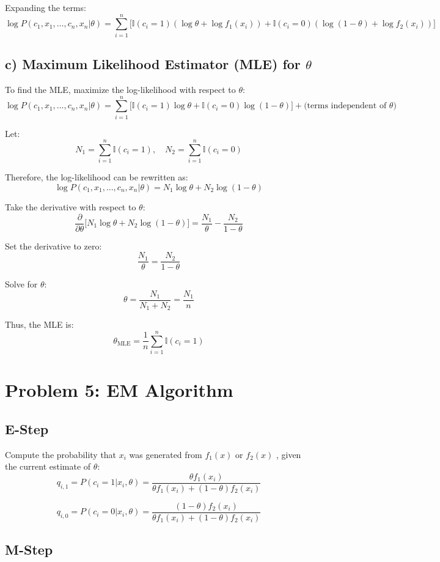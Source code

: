 \documentclass{article}
\begin{document}
Expanding the terms:
\[
\log P(c_1, x_1, \dots, c_n, x_n | \theta) =
\sum_{i=1}^n \big[ \mathbb{I}(c_i = 1) (\log \theta + \log f_1(x_i)) + \mathbb{I}(c_i = 0) (\log (1 - \theta) + \log f_2(x_i)) \big]
\]

\subsection*{c) Maximum Likelihood Estimator (MLE) for \(\theta\)}
To find the MLE, maximize the log-likelihood with respect to \( \theta \):
\[
\log P(c_1, x_1, \dots, c_n, x_n | \theta) = \sum_{i=1}^n \big[ \mathbb{I}(c_i = 1) \log \theta + \mathbb{I}(c_i = 0) \log (1 - \theta) \big] + \text{(terms independent of } \theta)
\]

Let:
\[
N_1 = \sum_{i=1}^n \mathbb{I}(c_i = 1), \quad N_2 = \sum_{i=1}^n \mathbb{I}(c_i = 0)
\]

Therefore, the  log-likelihood can be rewritten as:
\[
\log P(c_1, x_1, \dots, c_n, x_n | \theta) = N_1 \log \theta + N_2 \log (1 - \theta)
\]

Take the derivative with respect to \( \theta \):
\[
\frac{\partial}{\partial \theta} \big[ N_1 \log \theta + N_2 \log (1 - \theta) \big] = \frac{N_1}{\theta} - \frac{N_2}{1 - \theta}
\]

Set the derivative to zero:
\[
\frac{N_1}{\theta} = \frac{N_2}{1 - \theta}
\]

Solve for \( \theta \):
\[
\theta = \frac{N_1}{N_1 + N_2} = \frac{N_1}{n}  
\]

Thus, the MLE is:
\[
\theta_{\text{MLE}} = \frac{1}{n}  \sum_{i=1}^n \mathbb{I}(c_i = 1)
\]

\section*{Problem 5: EM Algorithm}

\subsection*{E-Step}
Compute the probability that \( x_i \) was generated from \( f_1(x) \) or \( f_2(x) \) , given the current estimate of \( \theta \):
\[
q_{i,1} = P(c_i = 1 | x_i, \theta) = \frac{\theta f_1(x_i)}{\theta f_1(x_i) + (1 - \theta) f_2(x_i)}
\]

\[
q_{i,0} = P(c_i = 0 | x_i, \theta) = \frac{(1 - \theta) f_2(x_i)}{\theta f_1(x_i) + (1 - \theta) f_2(x_i)}
\]

\subsection*{M-Step}
\end{document}

